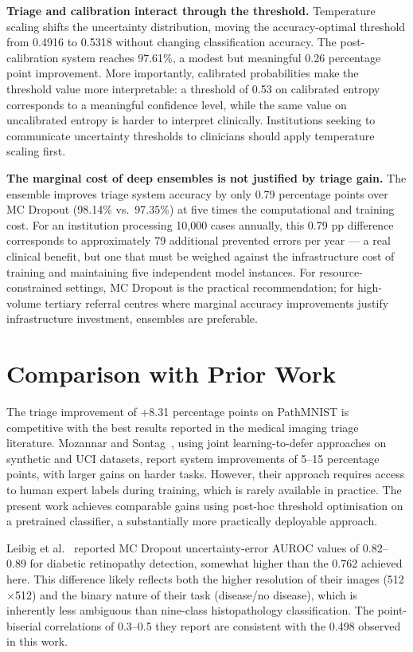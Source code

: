 \textbf{Triage and calibration interact through the threshold.} Temperature scaling shifts the uncertainty distribution, moving the accuracy-optimal threshold from 0.4916 to 0.5318 without changing classification accuracy. The post-calibration system reaches 97.61\%, a modest but meaningful 0.26 percentage point improvement. More importantly, calibrated probabilities make the threshold value more interpretable: a threshold of 0.53 on calibrated entropy corresponds to a meaningful confidence level, while the same value on uncalibrated entropy is harder to interpret clinically. Institutions seeking to communicate uncertainty thresholds to clinicians should apply temperature scaling first.

\textbf{The marginal cost of deep ensembles is not justified by triage gain.} The ensemble improves triage system accuracy by only 0.79 percentage points over MC Dropout (98.14\% vs.\ 97.35\%) at five times the computational and training cost. For an institution processing 10,000 cases annually, this 0.79 pp difference corresponds to approximately 79 additional prevented errors per year --- a real clinical benefit, but one that must be weighed against the infrastructure cost of training and maintaining five independent model instances. For resource-constrained settings, MC Dropout is the practical recommendation; for high-volume tertiary referral centres where marginal accuracy improvements justify infrastructure investment, ensembles are preferable.

\section{Comparison with Prior Work}

The triage improvement of +8.31 percentage points on PathMNIST is competitive with the best results reported in the medical imaging triage literature. Mozannar and Sontag~\cite{mozannar2020consistent}, using joint learning-to-defer approaches on synthetic and UCI datasets, report system improvements of 5--15 percentage points, with larger gains on harder tasks. However, their approach requires access to human expert labels during training, which is rarely available in practice. The present work achieves comparable gains using post-hoc threshold optimisation on a pretrained classifier, a substantially more practically deployable approach.

Leibig et al.~\cite{leibig2017leveraging} reported MC Dropout uncertainty-error AUROC values of 0.82--0.89 for diabetic retinopathy detection, somewhat higher than the 0.762 achieved here. This difference likely reflects both the higher resolution of their images (512$\times$512) and the binary nature of their task (disease/no disease), which is inherently less ambiguous than nine-class histopathology classification. The point-biserial correlations of 0.3--0.5 they report are consistent with the 0.498 observed in this work.

